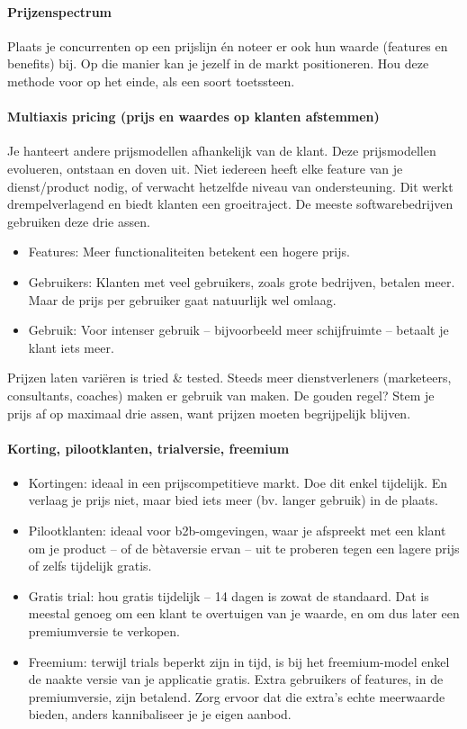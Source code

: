 \paragraph{Prijzenspectrum}

Plaats je concurrenten op een prijslijn én noteer er ook hun waarde (features en benefits) bij. Op die manier kan je jezelf in de markt positioneren. Hou deze methode voor op het einde, als een soort toetssteen.

\paragraph{Multiaxis pricing (prijs en waardes op klanten afstemmen)}

Je hanteert andere prijsmodellen afhankelijk van de klant. Deze prijsmodellen evolueren, ontstaan en doven uit. Niet iedereen heeft elke feature van je dienst/product nodig, of verwacht hetzelfde niveau van ondersteuning. Dit werkt drempelverlagend en biedt klanten een groeitraject. De meeste softwarebedrijven gebruiken deze drie assen.

\begin{itemize}
  \item Features: Meer functionaliteiten betekent een hogere prijs.
  \item Gebruikers: Klanten met veel gebruikers, zoals grote bedrijven, betalen meer. Maar de prijs per gebruiker gaat natuurlijk wel omlaag.
  \item Gebruik: Voor intenser gebruik – bijvoorbeeld meer schijfruimte – betaalt je klant iets meer.
\end{itemize}

Prijzen laten variëren is tried \& tested. Steeds meer dienstverleners (marketeers, consultants, coaches) maken er gebruik van maken. De gouden regel? Stem je prijs af op maximaal drie assen, want prijzen moeten begrijpelijk blijven.

\paragraph{Korting, pilootklanten, trialversie, freemium}

\begin{itemize}
  \item Kortingen: ideaal in een prijscompetitieve markt. Doe dit enkel tijdelijk. En verlaag je prijs niet, maar bied iets meer (bv. langer gebruik) in de plaats.
  \item Pilootklanten: ideaal voor b2b-omgevingen, waar je afspreekt met een klant om je product – of de bètaversie ervan – uit te proberen tegen een lagere prijs of zelfs tijdelijk gratis.
  \item Gratis trial: hou gratis tijdelijk – 14 dagen is zowat de standaard. Dat is meestal genoeg om een klant te overtuigen van je waarde, en om dus later een premiumversie te verkopen.
  \item Freemium: terwijl trials beperkt zijn in tijd, is bij het freemium-model enkel de naakte versie van je applicatie gratis. Extra gebruikers of features, in de premiumversie, zijn betalend. Zorg ervoor dat die extra’s echte meerwaarde bieden, anders kannibaliseer je je eigen aanbod.
\end{itemize}

